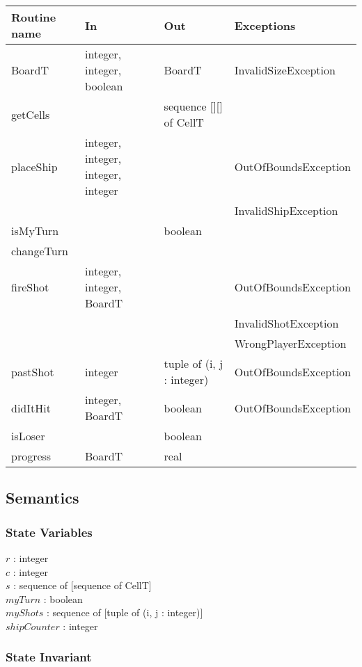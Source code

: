 \documentclass[12pt]{article}
\begin{document}
\begin{tabular}{| l | l | l | l |}
\hline
\textbf{Routine name} & \textbf{In} & \textbf{Out} & \textbf{Exceptions}\\
\hline
BoardT & integer, integer, boolean & BoardT & InvalidSizeException\\
\hline
getCells & ~ & sequence [][] of CellT & ~\\
\hline
placeShip & integer, integer, integer, integer & ~ & OutOfBoundsException \\
~ & ~ & ~ & InvalidShipException\\
\hline
isMyTurn & ~ & boolean & ~\\
\hline
changeTurn & ~ & ~ & ~\\
\hline
fireShot & integer, integer, BoardT & ~ & OutOfBoundsException \\
~ & ~ & ~ & InvalidShotException\\
~ & ~ & ~ & WrongPlayerException\\
\hline
pastShot & integer & tuple of (i, j : integer) & OutOfBoundsException\\
\hline
didItHit & integer, BoardT & boolean & OutOfBoundsException\\
\hline
isLoser & ~ & boolean & ~\\
\hline
progress & BoardT & real & ~\\
\hline
\end{tabular}

\subsection* {Semantics}

\subsubsection* {State Variables}

$r$ : integer\\
$c$ : integer\\
$s$ : sequence of [sequence of CellT]\\
$myTurn$ : boolean \\
$myShots$ : sequence of [tuple of (i, j : integer)]\\
$shipCounter$ : integer

\subsubsection* {State Invariant}
\end{document}
